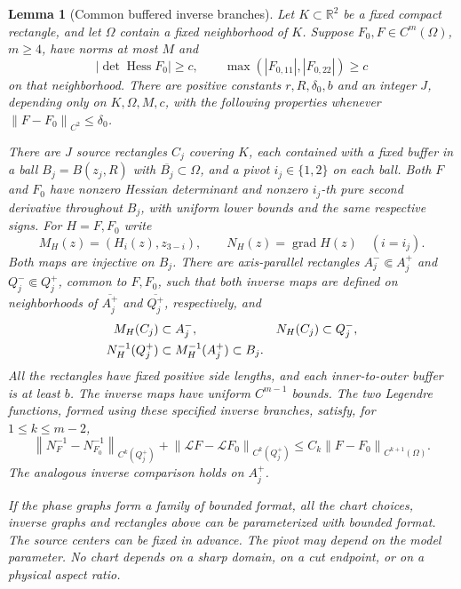 \documentclass[11pt,a4paper]{article}
\numberwithin{equation}{section}
\newtheorem{lemma}[theorem]{Lemma}
\theoremstyle{remark}
\newcommand{\R}{\mathbb R}
\newcommand{\norm}[1]{\left\lVert #1\right\rVert}
\DeclareMathOperator{\Hess}{Hess}
\DeclareMathOperator{\grad}{grad}
\newcommand{\Leg}{\mathcal L}
\begin{document}
\begin{lemma}[Common buffered inverse branches]\label{lem:buffered-inverses}
Let $K\subset\R^2$ be a fixed compact rectangle, and let $\Omega$ contain
a fixed neighborhood of $K$. Suppose $F_0,F\in C^m(\Omega)$, $m\ge4$,
have norms at most $M$ and
\[
 |\det\Hess F_0|\ge c,\qquad
 \max(|F_{0,11}|,|F_{0,22}|)\ge c
\]
on that neighborhood. There are positive constants $r,R,\delta_0,b$
and an integer $J$, depending only on $K,\Omega,M,c$, with the following
properties whenever $\norm{F-F_0}_{C^2}\le\delta_0$.

There are $J$ source rectangles $C_j$ covering $K$, each contained with
a fixed buffer in a ball $B_j=B(z_j,R)$ with
$\overline{B_j}\subset\Omega$, and a pivot
$i_j\in\{1,2\}$ on each ball. Both $F$ and $F_0$ have nonzero Hessian
determinant and nonzero $i_j$-th pure second derivative throughout $B_j$,
with uniform lower bounds and the same respective signs. For $H=F,F_0$
write
\[
 M_H(z)=(H_i(z),z_{3-i}),\qquad N_H(z)=\grad H(z)
 \quad(i=i_j).
\]
Both maps are injective on $B_j$. There are axis-parallel rectangles
$A_j^-\Subset A_j^+$ and $Q_j^-\Subset Q_j^+$, common to $F,F_0$, such
that both inverse maps are defined on neighborhoods of $\overline{A_j^+}$
and $\overline{Q_j^+}$, respectively, and
\begin{align}
 M_H(C_j)&\subset A_j^-,&N_H(C_j)&\subset Q_j^-,\notag\\
 N_H^{-1}(Q_j^+)&\subset M_H^{-1}(A_j^+)\subset B_j.
 \label{eq:compatible-rectangles}
\end{align}
All the rectangles have fixed positive side lengths, and each inner-to-outer
buffer is at least $b$. The inverse maps have uniform $C^{m-1}$ bounds.
The two Legendre functions, formed using these specified inverse branches,
satisfy, for $1\le k\le m-2$,
\begin{equation}\label{eq:inverse-stability}
 \norm{N_F^{-1}-N_{F_0}^{-1}}_{C^k(Q_j^+)}
 +\norm{\Leg F-\Leg F_0}_{C^k(Q_j^+)}
 \le C_k\norm{F-F_0}_{C^{k+1}(\Omega)}.
\end{equation}
The analogous inverse comparison holds on $A_j^+$.

If the phase graphs form a family of bounded format, all the chart
choices, inverse graphs and rectangles above can be parameterized with
bounded format. The source centers can be fixed in advance. The pivot
may depend on the model parameter. No chart depends on a sharp domain,
on a cut endpoint, or on a physical aspect ratio.
\end{lemma}
\end{document}
